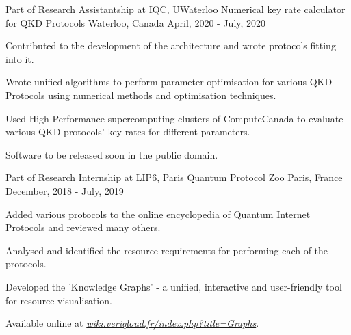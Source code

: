 

\begin{cventries}

  \cventry
    {Part of Research Assistantship at IQC, UWaterloo} %
    {Numerical key rate calculator for QKD Protocols} %
    {Waterloo, Canada} %
    {April, 2020 - July, 2020} %
    {
      \begin{cvitems} %
        \item {Contributed to the development of the architecture and wrote protocols fitting into it.}
        \item {Wrote unified algorithms to perform parameter optimisation for various QKD Protocols using numerical methods and optimisation techniques.}
        \item {Used High Performance supercomputing clusters of ComputeCanada to evaluate various QKD protocols' key rates for different parameters.}
        \item {Software to be released soon in the public domain.}
      \end{cvitems}
    }
    
  \cventry
    {Part of Research Internship at LIP6, Paris} %
    {Quantum Protocol Zoo} %
    {Paris, France} %
    {December, 2018 - July, 2019} %
    {
      \begin{cvitems} %
        \item {Added various protocols to the online encyclopedia of Quantum Internet Protocols and reviewed many others.}
        \item {Analysed and identified the resource requirements for performing each of the protocols.}
        \item {Developed the 'Knowledge Graphs' - a unified, interactive and user-friendly tool for resource visualisation.}
        \item {Available online at  \emph{\href{https://wiki.veriqloud.fr/index.php?title=Graphs}{wiki.veriqloud.fr/index.php?title=Graphs}}.}
      \end{cvitems}
    }


\end{cventries}
